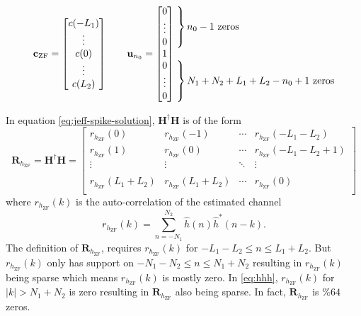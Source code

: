 \begin{equation}
	\mathbf{c}_\text{ZF} = \begin{bmatrix} c(-L_1) \\ \vdots \\ c(0) \\ \vdots \\ c(L_2) \end{bmatrix}
	\qquad
	\mathbf{u}_{n_0} = \begin{bmatrix} 0 \\ \vdots \\ 0 \\ 1 \\ 0 \\ \vdots \\ 0 \end{bmatrix}
	\begin{matrix*}[l] \left. \vphantom{\begin{matrix} 0 \\ \vdots \\ 0 \end{matrix}} \right\}
		\text{$n_0-1$ zeros}
		\\ \\
		\left. \vphantom{\begin{matrix} 0 \\ \vdots \\ 0 \end{matrix}} \right\}
		\text{$N_1+N_2+L_1+L_2-n_0+1$ zeros}
		\end{matrix*}
\label{eq:jeff-cu-vector-def}
\end{equation}

In equation \eqref{eq:jeff-spike-solution}, $\mathbf{H}^\dag\mathbf{H}$ is of the form
\begin{equation}
\mathbf{R}_{h_\text{ZF}} = \mathbf{H}^\dag\mathbf{H} = 
	\begin{bmatrix}
		r_{h_\text{ZF}}(0) 				& r_{h_\text{ZF}}(-1) 			& \cdots & r_{h_\text{ZF}}(-L_1-L_2)	\\
		r_{h_\text{ZF}}(1) 		& r_{h_\text{ZF}}(0) 			& \cdots & r_{h_\text{ZF}}(-L_1-L_2+1)		\\
		\vdots 				& \vdots 			& \ddots & \vdots  			\\
		\\
		r_{h_\text{ZF}}(L_1+L_2) & r_{h_\text{ZF}}(L_1+L_2)	& \cdots & r_{h_\text{ZF}}(0)  			\\
	\end{bmatrix}
	\label{eq:hhh}
\end{equation}
where $r_{h_\text{ZF}}(k)$ is the auto-correlation of the estimated channel
\begin{equation}
r_{h_\text{ZF}}(k) = \sum_{n=-N_1}^{N_2} \hat{h}(n)\hat{h}^\ast(n-k).
\end{equation}
The definition of $\mathbf{R}_{h_\text{ZF}}$, requires $r_{h_\text{ZF}}(k)$ for $-L_1-L_2 \leq n \leq L_1+L_2$. 
But $r_{h_\text{ZF}}(k)$ only has support on $-N_1-N_2 \leq n \leq N_1+N_2$ resulting in $r_{h_\text{ZF}}(k)$ being sparse which means $r_{h_\text{ZF}}(k)$ is mostly zero. 
In \eqref{eq:hhh}, $r_{h_\text{ZF}}(k)$ for $\left|k\right| > N_1+N_2$ is zero resulting in $\mathbf{R}_{h_\text{ZF}}$ also being sparse. 
In fact, $\mathbf{R}_{h_\text{ZF}}$ is $\% 64$ zeros.

